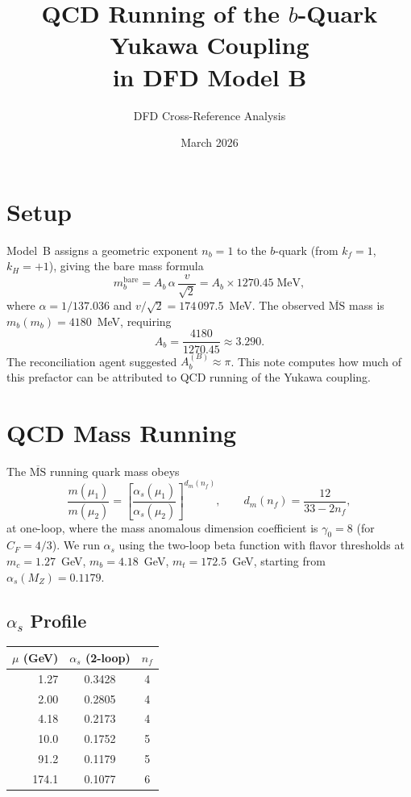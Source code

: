 \documentclass[11pt]{article}
\title{QCD Running of the $b$-Quark Yukawa Coupling\\in DFD Model B}
\author{DFD Cross-Reference Analysis}
\date{March 2026}
\begin{document}
\maketitle

\section{Setup}

Model~B assigns a geometric exponent $n_b = 1$ to the $b$-quark
(from $k_f = 1$, $k_H = +1$), giving the bare mass formula
\begin{equation}
  m_b^{\text{bare}} = A_b \,\alpha \,\frac{v}{\sqrt{2}}
  = A_b \times 1270.45 \;\text{MeV},
\end{equation}
where $\alpha = 1/137.036$ and $v/\sqrt{2} = 174\,097.5$~MeV.
The observed $\overline{\text{MS}}$ mass is $m_b(m_b) = 4180$~MeV,
requiring
\begin{equation}
  A_b = \frac{4180}{1270.45} \approx 3.290.
\end{equation}
The reconciliation agent suggested $A_b^{(B)} \approx \pi$.
This note computes how much of this prefactor can be attributed to
QCD running of the Yukawa coupling.

\section{QCD Mass Running}

The $\overline{\text{MS}}$ running quark mass obeys
\begin{equation}
  \frac{m(\mu_1)}{m(\mu_2)}
  = \left[\frac{\alpha_s(\mu_1)}{\alpha_s(\mu_2)}\right]^{d_m(n_f)},
  \qquad
  d_m(n_f) = \frac{12}{33 - 2n_f},
\end{equation}
at one-loop, where the mass anomalous dimension coefficient is
$\gamma_0 = 8$ (for $C_F = 4/3$).  We run $\alpha_s$ using the
two-loop beta function with flavor thresholds at
$m_c = 1.27$~GeV, $m_b = 4.18$~GeV, $m_t = 172.5$~GeV, starting from
$\alpha_s(M_Z) = 0.1179$.

\subsection{$\alpha_s$ Profile}

\begin{center}
\begin{tabular}{rcc}
\toprule
$\mu$ (GeV) & $\alpha_s$ (2-loop) & $n_f$ \\
\midrule
1.27   & 0.3428 & 4 \\
2.00   & 0.2805 & 4 \\
4.18   & 0.2173 & 4 \\
10.0   & 0.1752 & 5 \\
91.2   & 0.1179 & 5 \\
174.1  & 0.1077 & 6 \\
\bottomrule
\end{tabular}
\end{center}
\end{document}
